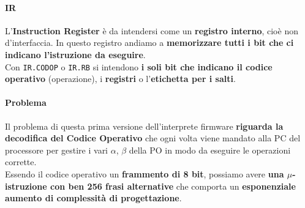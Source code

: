 \documentclass[10pt]{report}
\begin{document}
\paragraph{IR} L'\textbf{Instruction Register} è da intendersi come un \textbf{registro interno}, cioè non d'interfaccia. In questo registro andiamo a \textbf{memorizzare tutti i bit che ci indicano l'istruzione da eseguire}.\\
Con \texttt{IR.CODOP} o \texttt{IR.RB} si intendono \textbf{i soli bit che indicano il codice operativo} (operazione), i \textbf{registri} o l'\textbf{etichetta per i salti}.
\paragraph{Problema} Il problema di questa prima versione dell'interprete firmware \textbf{riguarda la decodifica del Codice Operativo} che ogni volta viene mandato alla PC del processore per gestire i vari $\alpha$, $\beta$ della PO in modo da eseguire le operazioni corrette.\\
Essendo il codice operativo un \textbf{frammento di 8 bit}, possiamo avere \textbf{una $\mu$-istruzione con ben 256 frasi alternative} che comporta un \textbf{esponenziale aumento di complessità di progettazione}.
\end{document}
